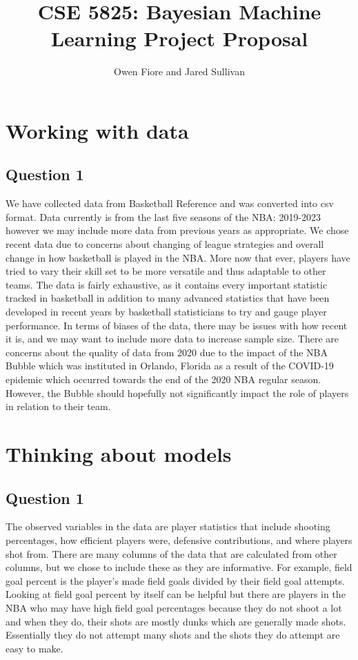 \documentclass[12pt, letterpaper, titlepage]{article}
\title{CSE 5825: Bayesian Machine Learning Project Proposal}
\author{Owen Fiore and Jared Sullivan}
\begin{document}
\maketitle

\section{Working with data}
\subsection{Question 1}
We have collected data from Basketball Reference and was converted into csv
format. Data currently is from the last five seasons of the NBA: 2019-2023 however
we may include more data from previous years as appropriate.  We chose recent
data due to concerns about changing of league strategies and overall change
in how basketball is played in the NBA.  More now that ever, players have tried
to vary their skill set to be more versatile and thus adaptable to other teams.
The data is fairly exhaustive, as it contains every important statistic tracked
in basketball in addition to many advanced statistics that have been developed
in recent years by basketball statisticians to try and gauge player performance.
In terms of biases of the data, there may be issues with how recent it is, and
we may want to include more data to increase sample size.  There are concerns
about the quality of data from 2020 due to the impact of the NBA Bubble which
was instituted in Orlando, Florida as a result of the COVID-19 epidemic which
occurred towards the end of the 2020 NBA regular season.  However, the Bubble
should hopefully not significantly impact the role of players in relation to
their team.

\section{Thinking about models}
\subsection{Question 1}
The observed variables in the data are player statistics that include shooting
percentages, how efficient players were, defensive contributions, and where
players shot from.  There are many columns of the data that are calculated from
other columns, but we chose to include these as they are informative.  For
example, field goal percent is the player's made field goals divided by their
field goal attempts.  Looking at field goal percent by itself can be helpful but
there are players in the NBA who may have high field goal percentages because
they do not shoot a lot and when they do, their shots are mostly dunks which are
generally made shots.  Essentially they do not attempt many shots and the shots
they do attempt are easy to make.
\end{document}

